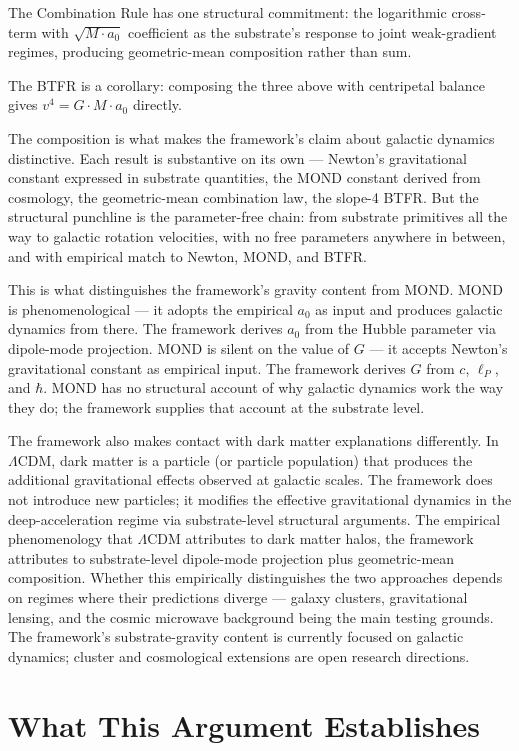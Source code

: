 \documentclass[11pt,a4paper]{article}
\begin{document}
The Combination Rule has one structural commitment: the logarithmic cross-term with $\sqrt{M\cdot a_0}$ coefficient as the substrate's response to joint weak-gradient regimes, producing geometric-mean composition rather than sum.

The BTFR is a corollary: composing the three above with centripetal balance gives $v^4 = G\cdot M\cdot a_0$ directly.

The composition is what makes the framework's claim about galactic dynamics distinctive. Each result is substantive on its own --- Newton's gravitational constant expressed in substrate quantities, the MOND constant derived from cosmology, the geometric-mean combination law, the slope-4 BTFR. But the structural punchline is the parameter-free chain: from substrate primitives all the way to galactic rotation velocities, with no free parameters anywhere in between, and with empirical match to Newton, MOND, and BTFR.

This is what distinguishes the framework's gravity content from MOND. MOND is phenomenological --- it adopts the empirical $a_0$ as input and produces galactic dynamics from there. The framework derives $a_0$ from the Hubble parameter via dipole-mode projection. MOND is silent on the value of $G$ --- it accepts Newton's gravitational constant as empirical input. The framework derives $G$ from $c$, $\ell_P$, and $\hbar$. MOND has no structural account of why galactic dynamics work the way they do; the framework supplies that account at the substrate level.

The framework also makes contact with dark matter explanations differently. In $\Lambda$CDM, dark matter is a particle (or particle population) that produces the additional gravitational effects observed at galactic scales. The framework does not introduce new particles; it modifies the effective gravitational dynamics in the deep-acceleration regime via substrate-level structural arguments. The empirical phenomenology that $\Lambda$CDM attributes to dark matter halos, the framework attributes to substrate-level dipole-mode projection plus geometric-mean composition. Whether this empirically distinguishes the two approaches depends on regimes where their predictions diverge --- galaxy clusters, gravitational lensing, and the cosmic microwave background being the main testing grounds. The framework's substrate-gravity content is currently focused on galactic dynamics; cluster and cosmological extensions are open research directions.

\section{What This Argument Establishes}
\end{document}
